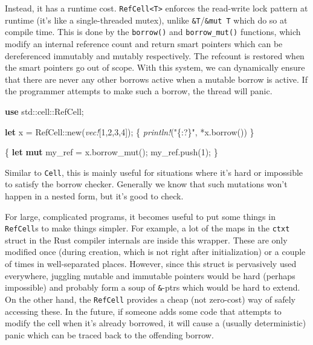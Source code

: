 \documentclass[a4paper,]{book}
\newenvironment{Shaded}{\begin{snugshade}}{\end{snugshade}}
\newcommand{\KeywordTok}[1]{\textcolor[rgb]{0.13,0.29,0.53}{\textbf{{#1}}}}
\newcommand{\DecValTok}[1]{\textcolor[rgb]{0.00,0.00,0.81}{{#1}}}
\newcommand{\StringTok}[1]{\textcolor[rgb]{0.31,0.60,0.02}{{#1}}}
\newcommand{\PreprocessorTok}[1]{\textcolor[rgb]{0.56,0.35,0.01}{\textit{{#1}}}}
\newcommand{\NormalTok}[1]{{#1}}
\begin{document}
Instead, it has a runtime cost.
\texttt{RefCell\textless{}T\textgreater{}} enforces the read-write lock
pattern at runtime (it's like a single-threaded mutex), unlike
\texttt{\&T}/\texttt{\&mut\ T} which do so at compile time. This is done
by the \texttt{borrow()} and \texttt{borrow\_mut()} functions, which
modify an internal reference count and return smart pointers which can
be dereferenced immutably and mutably respectively. The refcount is
restored when the smart pointers go out of scope. With this system, we
can dynamically ensure that there are never any other borrows active
when a mutable borrow is active. If the programmer attempts to make such
a borrow, the thread will panic.

\begin{Shaded}
\begin{Highlighting}[]
\KeywordTok{use} \NormalTok{std::cell::RefCell;}

\KeywordTok{let} \NormalTok{x = RefCell::new(}\PreprocessorTok{vec!}\NormalTok{[}\DecValTok{1}\NormalTok{,}\DecValTok{2}\NormalTok{,}\DecValTok{3}\NormalTok{,}\DecValTok{4}\NormalTok{]);}
\NormalTok{\{}
    \PreprocessorTok{println!}\NormalTok{(}\StringTok{"\{:?\}"}\NormalTok{, *x.borrow())}
\NormalTok{\}}

\NormalTok{\{}
    \KeywordTok{let} \KeywordTok{mut} \NormalTok{my_ref = x.borrow_mut();}
    \NormalTok{my_ref.push(}\DecValTok{1}\NormalTok{);}
\NormalTok{\}}
\end{Highlighting}
\end{Shaded}

Similar to \texttt{Cell}, this is mainly useful for situations where
it's hard or impossible to satisfy the borrow checker. Generally we know
that such mutations won't happen in a nested form, but it's good to
check.

For large, complicated programs, it becomes useful to put some things in
\texttt{RefCell}s to make things simpler. For example, a lot of the maps
in the \texttt{ctxt} struct in the Rust compiler internals are inside
this wrapper. These are only modified once (during creation, which is
not right after initialization) or a couple of times in well-separated
places. However, since this struct is pervasively used everywhere,
juggling mutable and immutable pointers would be hard (perhaps
impossible) and probably form a soup of \texttt{\&}-ptrs which would be
hard to extend. On the other hand, the \texttt{RefCell} provides a cheap
(not zero-cost) way of safely accessing these. In the future, if someone
adds some code that attempts to modify the cell when it's already
borrowed, it will cause a (usually deterministic) panic which can be
traced back to the offending borrow.
\end{document}
